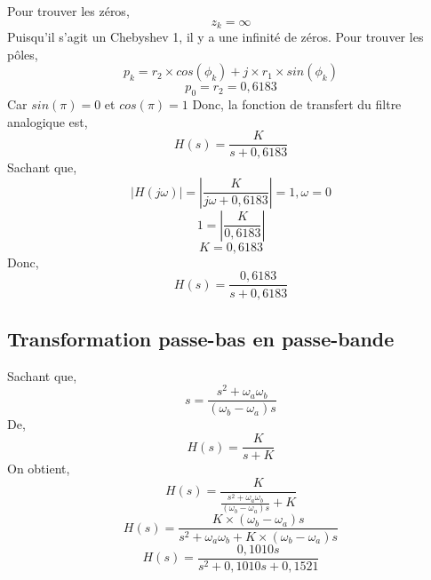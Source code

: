 \documentclass{article}
\begin{document}
Pour trouver les zéros,
\begin{equation}
z_k = \infty
\end{equation}
Puisqu'il s'agit un Chebyshev 1, il y a une infinité de zéros.
\newline
\newline
Pour trouver les pôles,
\begin{equation}
p_k = r_2 \times cos(\phi_k) + j \times r_1 \times sin(\phi_k)
\end{equation}
\begin{equation}
p_0 = r_2 = 0,6183
\end{equation}
\newline
Car $sin(\pi) = 0$ et $cos(\pi) = 1$
\newline
\newline
Donc, la fonction de transfert du filtre analogique est,
\begin{equation}
H(s) = \frac{K}{s+0,6183}
\end{equation}
Sachant que,
\begin{equation}
|H(j\omega)| = |\frac{K}{j\omega + 0,6183}| = 1, \omega = 0
\end{equation}
\begin{equation}
1 = |\frac{K}{0,6183}|
\end{equation}
\begin{equation}
K = 0,6183
\end{equation}
Donc,
\begin{equation}
H(s) = \frac{0,6183}{s+0,6183}
\end{equation}
\subsection{Transformation passe-bas en passe-bande}
Sachant que,
\begin{equation}
s = \frac{s^2 + \omega_a \omega_b}{(\omega_b - \omega_a)s}
\end{equation}
De,
\begin{equation}
H(s) = \frac{K}{s+K}
\end{equation}
On obtient,
\begin{equation}
H(s) = \frac{K}{\frac{s^2 + \omega_a \omega_b}{(\omega_b - \omega_a)s}+K}
\end{equation}
\begin{equation}
H(s) = \frac{K \times (\omega_b - \omega_a)s}{s^2 + \omega_a \omega_b+K \times (\omega_b - \omega_a)s}
\end{equation}
\begin{equation}
H(s) = \frac{0,1010s}{s^2 + 0,1010s + 0,1521}
\end{equation}
\newline
\end{document}

